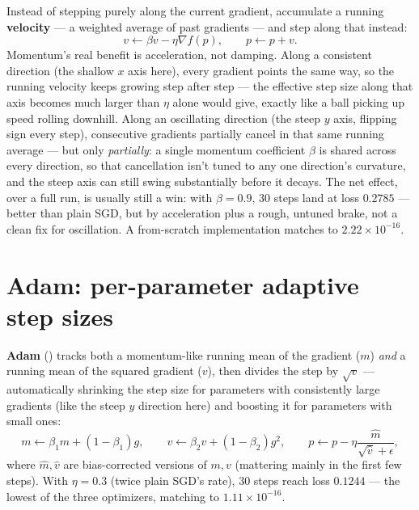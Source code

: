 Instead of stepping purely along the current gradient, accumulate a running \textbf{velocity} --- a weighted average of past gradients --- and step along that instead:
\begin{equation}
v \leftarrow \beta v - \eta\nabla f(p), \qquad p \leftarrow p + v.
\end{equation}
Momentum's real benefit is acceleration, not damping. Along a consistent direction (the shallow $x$ axis here), every gradient points the same way, so the running velocity keeps growing step after step --- the effective step size along that axis becomes much larger than $\eta$ alone would give, exactly like a ball picking up speed rolling downhill. Along an oscillating direction (the steep $y$ axis, flipping sign every step), consecutive gradients partially cancel in that same running average --- but only \emph{partially}: a single momentum coefficient $\beta$ is shared across every direction, so that cancellation isn't tuned to any one direction's curvature, and the steep axis can still swing substantially before it decays. The net effect, over a full run, is usually still a win: with $\beta=0.9$, 30 steps land at loss $0.2785$ --- better than plain SGD, but by acceleration plus a rough, untuned brake, not a clean fix for oscillation. A from-scratch implementation matches  to $2.22\times10^{-16}$.

\section{Adam: per-parameter adaptive step sizes}

\textbf{Adam} () tracks both a momentum-like running mean of the gradient ($m$) \emph{and} a running mean of the squared gradient ($v$), then divides the step by $\sqrt{v}$ --- automatically shrinking the step size for parameters with consistently large gradients (like the steep $y$ direction here) and boosting it for parameters with small ones:
\begin{equation}
m \leftarrow \beta_1 m + (1-\beta_1)g, \qquad v \leftarrow \beta_2 v + (1-\beta_2)g^2, \qquad p \leftarrow p - \eta\frac{\hat m}{\sqrt{\hat v}+\epsilon},
\end{equation}
where $\hat m,\hat v$ are bias-corrected versions of $m,v$ (mattering mainly in the first few steps). With $\eta=0.3$ (twice plain SGD's rate), 30 steps reach loss $0.1244$ --- the lowest of the three optimizers, matching  to $1.11\times10^{-16}$.

